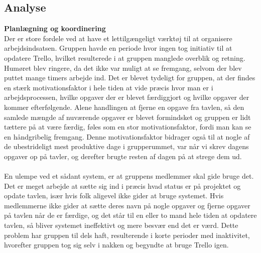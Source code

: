 \subsection{Analyse}

\textbf{Planlægning og koordinering}\\ %
Der er store fordele ved at have et lettilgængeligt værktøj til at organisere arbejdsindsatsen. Gruppen havde en periode hvor ingen tog initiativ til at opdatere Trello, hvilket resulterede i at gruppen manglede overblik og retning. Humøret blev ringere, da det ikke var muligt at se fremgang, selvom der blev puttet mange timers arbejde ind. Det er blevet tydeligt for gruppen, at der findes en stærk motivationsfaktor i hele tiden at vide præcis hvor man er i arbejdsprocessen, hvilke opgaver der er blevet færdiggjort og hvilke opgaver der kommer efterfølgende. Alene handlingen at fjerne en opgave fra tavlen, så den samlede mængde af nuværende opgaver er blevet formindsket og gruppen er lidt tættere på at være færdig, føles som en stor motivationsfaktor, fordi man kan se en håndgribelig fremgang. Denne motivationsfaktor bidrager også til at nogle af de ubestrideligt mest produktive dage i grupperummet, var når vi skrev dagens opgaver op på tavler, og derefter brugte resten af dagen på at strege dem ud.\\\\
En ulempe ved et sådant system, er at gruppens medlemmer skal gide bruge det. Det er meget arbejde at sætte sig ind i præcis hvad status er på projektet og opdate tavlen, især hvis folk aligevel ikke gider at bruge systemet. Hvis medlemmerne ikke gider at sætte deres navn på nogle opgaver og fjerne opgaver på tavlen når de er færdige, og det står til en eller to mand hele tiden at opdatere tavlen, så bliver systemet ineffektivt og mere besvær end det er værd. Dette problem har gruppen til dels haft, resulterende i korte perioder med inaktivitet, hvorefter gruppen tog sig selv i nakken og begyndte at bruge Trello igen.


